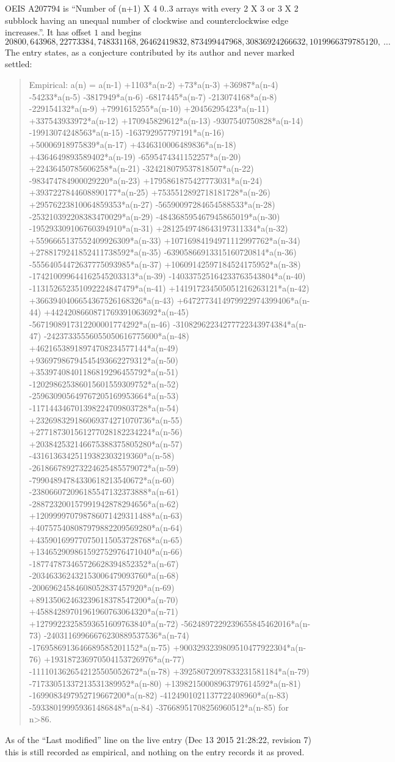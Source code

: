 \documentclass[11pt,a4paper]{article}
\theoremstyle{plain}
\theoremstyle{definition}
\begin{document}
OEIS A207794 is ``Number of (n+1) X 4 0..3 arrays with every 2 X 3 or 3 X 2 subblock having an unequal number of clockwise and counterclockwise edge increases.''. It has offset $1$ and begins
\[
20800, 643968, 22773384, 748331168, 26462419832, 873499447968, 30836924266632, 1019966379785120,\ \dots
\]
The entry states, as a conjecture contributed by its author and never marked settled:
\begin{quote}
Empirical: a(n) = a(n-1) +1103*a(n-2) +73*a(n-3) +36987*a(n-4) -54233*a(n-5) -3817949*a(n-6) -6817445*a(n-7) -213074168*a(n-8) -229154132*a(n-9) +7991615255*a(n-10) +20456295423*a(n-11) +337543933972*a(n-12) +170945829612*a(n-13) -9307540750828*a(n-14) -19913074248563*a(n-15) -163792957797191*a(n-16) +50006918975839*a(n-17) +4346310006489836*a(n-18) +4364649893589402*a(n-19) -6595474341152257*a(n-20) +22436450785606258*a(n-21) -324218079537818507*a(n-22) -983474784900029220*a(n-23) +1795861875427773031*a(n-24) +3937227844608890177*a(n-25) +7535512892718181728*a(n-26) +29576223810064859353*a(n-27) -56590097284654588533*a(n-28) -253210392208383470029*a(n-29) -484368595467945865019*a(n-30) -195293309106760394910*a(n-31) +2812549748643197311334*a(n-32) +5596665137552409926309*a(n-33) +10716984194971112997762*a(n-34) +2788179241852411738592*a(n-35) -63905866913315160720814*a(n-36) -55564054472637775093985*a(n-37) +10609142597184524175952*a(n-38) -174210099644162545203313*a(n-39) -140337525164233763543804*a(n-40) -113152652351092224847479*a(n-41) +141917234505051216263121*a(n-42) +3663940406654367526168326*a(n-43) +6472773414979922974399406*a(n-44) +4424208660871769391063692*a(n-45) -5671908917312200001774292*a(n-46) -31082962234277722343974384*a(n-47) -24237335556055050616775600*a(n-48) +46216538918974708234577144*a(n-49) +93697986794545493662279312*a(n-50) +35397408401186819296455792*a(n-51) -120298625386015601559309752*a(n-52) -259630905649767205169953664*a(n-53) -117144346701398224709803728*a(n-54) +232698329186069374271070736*a(n-55) +277187301561277028182234224*a(n-56) +203842532146675388375805280*a(n-57) -43161363425119382303219360*a(n-58) -261866789273224625485579072*a(n-59) -79904894784330618213540672*a(n-60) -238066072096185547132373888*a(n-61) -288723200157991942878294656*a(n-62) +120999970798786071429311488*a(n-63) +407575408087979882209569280*a(n-64) +435901699770750115053728768*a(n-65) +134652909861592752976471040*a(n-66) -187747873465726628394852352*a(n-67) -203463362432153006479093760*a(n-68) -20069624584608052837457920*a(n-69) +89135062463239618378547200*a(n-70) +45884289701961960763064320*a(n-71) +12799223258593651609763840*a(n-72) -5624897229239655845462016*a(n-73) -24031169966676230889537536*a(n-74) -1769586913646689585201152*a(n-75) +9003293239809510477922304*a(n-76) +193187236970504153726976*a(n-77) -1111013626542125505052672*a(n-78) +39258072097833231581184*a(n-79) -71733051337213531389952*a(n-80) +13982150008963797614592*a(n-81) -1699083497952719667200*a(n-82) -4124901021137722408960*a(n-83) -593380199959361486848*a(n-84) -37668951708256960512*a(n-85) for n>86.
\end{quote}
As of the ``Last modified'' line on the live entry (Dec 13 2015 21:28:22, revision 7) this is still
recorded as empirical, and nothing on the entry records it as proved.
\end{document}
